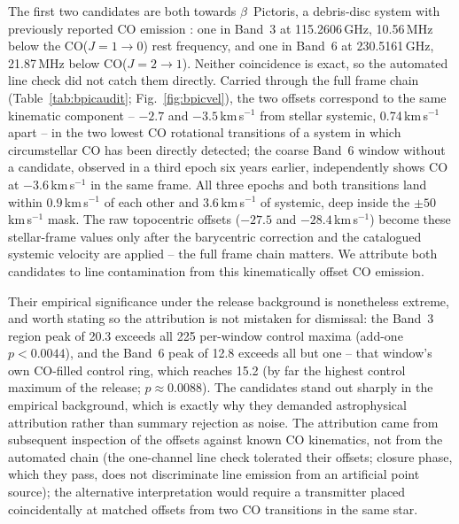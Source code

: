 \documentclass{openjournal}
\begin{document}
The first two candidates are both towards $\beta$~Pictoris, a
debris-disc system with previously reported CO emission
\citep{Matra2017}: one in Band~3 at 115.2606\,GHz, 10.56\,MHz below
the CO($J{=}1{\to}0$) rest frequency, and one in Band~6 at
230.5161\,GHz, 21.87\,MHz below CO($J{=}2{\to}1$). Neither
coincidence is exact, so the automated line check did not catch them
directly. Carried through the full frame chain
(Table~\ref{tab:bpicaudit}; Fig.~\ref{fig:bpicvel}), the two offsets
correspond to the same kinematic component -- $-2.7$ and
$-3.5$\,km\,s$^{-1}$ from stellar systemic, 0.74\,km\,s$^{-1}$ apart
-- in the two lowest CO rotational transitions of a system in which
circumstellar CO has been directly detected; the coarse
Band~6 window without a candidate, observed in a third epoch six
years earlier,
independently shows CO at $-3.6$\,km\,s$^{-1}$ in the same frame. All
three epochs and both transitions land within $0.9$\,km\,s$^{-1}$ of
each other and $3.6$\,km\,s$^{-1}$ of systemic, deep inside the
$\pm50$\,km\,s$^{-1}$ mask. The raw topocentric offsets ($-27.5$ and
$-28.4$\,km\,s$^{-1}$) become these stellar-frame values only after
the barycentric correction and the catalogued systemic velocity are
applied -- the full frame chain matters. We attribute both candidates
to line contamination from this kinematically offset CO emission.

Their empirical significance under the release background is
nonetheless extreme, and worth stating so the attribution is not
mistaken for dismissal: the Band~3 region peak of 20.3 exceeds all
225 per-window control maxima (add-one $p<0.0044$), and the Band~6
peak of 12.8 exceeds all but one -- that window's own CO-filled
control ring, which reaches 15.2 (by far the highest control maximum
of the release; $p\approx0.0088$). The candidates stand out sharply
in the empirical background, which is exactly why they demanded
astrophysical attribution rather than summary rejection as noise. The
attribution came from subsequent inspection of the offsets against
known CO kinematics, not from the automated chain (the one-channel
line check tolerated their offsets; closure phase, which they pass,
does not discriminate line emission from an artificial point source);
the alternative interpretation would require a transmitter placed
coincidentally at matched offsets from two CO transitions in the same
star.
\end{document}
